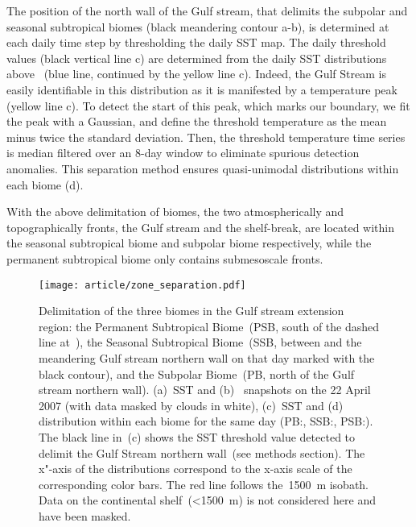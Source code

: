The position of the north wall of the Gulf stream, that delimits the subpolar and seasonal subtropical biomes (black meandering contour a-b), is determined at each daily time step by thresholding the daily SST map.
The daily threshold values (black vertical line c) are determined from the daily SST distributions above ~(blue line, continued by the yellow line c).
Indeed, the Gulf Stream is easily identifiable in this distribution as it is manifested by a temperature peak (yellow line c).
To detect the start of this peak, which marks our boundary, we fit the peak with a Gaussian, and define the threshold temperature as the mean minus twice the standard deviation.
Then, the threshold temperature time series is median filtered over an 8-day window to eliminate spurious detection anomalies.
This separation method ensures quasi-unimodal  distributions within each biome (d).

With the above delimitation of biomes, the two atmospherically and topographically fronts,  the Gulf stream and the shelf-break, are located within the seasonal subtropical biome and subpolar biome respectively, while the permanent subtropical biome only contains submesoscale fronts.

\begin{figure}
  \centering
  \texttt{[image: article/zone\_separation.pdf]}
  \caption[Delimitation of biomes]{
    Delimitation of the three biomes in the Gulf stream extension region: the Permanent Subtropical Biome~(PSB, south of the dashed line at~), the Seasonal Subtropical Biome~(SSB, between  and the meandering Gulf stream northern wall on that day marked with the black contour), and the Subpolar Biome~(PB, north of the Gulf stream northern wall).
    (a)~SST and (b)~ snapshots on the 22 April 2007 (with data masked by clouds in white), (c)~SST and (d)~  distribution within each biome for the same day (PB:\@blue, SSB:\@yellow, PSB:\@red).
    The black line in~(c) shows the SST threshold value detected to delimit the Gulf Stream northern wall~(see methods section).
    The x"-axis of the distributions correspond to the x-axis scale of the corresponding color bars.
    The red line follows the~\qty{1500}{m} isobath.
    Data on the continental shelf~(\qty{<1500}{\m}) is not considered here and have been masked.
  }%
  \label{fig:zone-separation}
\end{figure}



